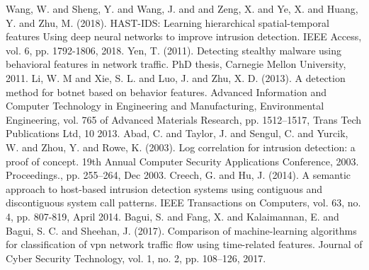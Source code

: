 \documentclass[conference]{IEEEtran}
\begin{document}
\begin{thebibliography}{00}
 Wang, W. and Sheng, Y. and Wang, J. and and Zeng, X. and Ye, X. and Huang, Y. and Zhu, M. (2018). HAST-IDS: Learning hierarchical spatial-temporal features Using deep neural networks to improve intrusion detection. IEEE Access, vol. 6, pp. 1792-1806, 2018.
 Yen, T. (2011). Detecting stealthy malware using behavioral features in network traffic. PhD thesis, Carnegie Mellon University, 2011.
 Li, W. M and Xie, S. L. and Luo, J. and Zhu, X. D. (2013). A detection method for botnet based on behavior features. Advanced Information and Computer Technology in Engineering and Manufacturing, Environmental Engineering, vol. 765 of Advanced Materials Research, pp. 1512–1517, Trans Tech Publications Ltd, 10 2013.
 Abad, C. and Taylor, J. and Sengul, C.  and Yurcik, W. and Zhou, Y. and Rowe, K. (2003). Log correlation for intrusion detection: a proof of concept. 19th Annual Computer Security Applications Conference, 2003. Proceedings., pp. 255–264, Dec 2003.
 Creech, G. and Hu, J. (2014). A semantic approach to host-based intrusion detection systems using contiguous and discontiguous system call patterns. IEEE Transactions on Computers, vol. 63, no. 4, pp. 807-819, April 2014.
 Bagui, S. and Fang, X. and Kalaimannan, E. and Bagui, S. C. and Sheehan, J. (2017). Comparison of machine-learning algorithms for classification of vpn network traffic flow using time-related features. Journal of Cyber Security Technology, vol. 1, no. 2, pp. 108–126, 2017.
\end{thebibliography}

\vspace{12pt}
\color{red}
\end{document}
